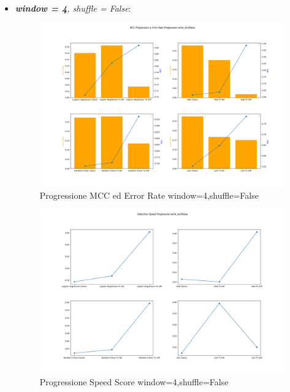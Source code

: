 \begin{itemize}
    \newpage
    \item \textit{\textbf{window = 4}, shuffle = False}:
    \begin{figure}[H]
    \centering
    \includegraphics[width=0.94\linewidth]{MCC_Progression_win4_shufFalse.png}
    \caption{Progressione MCC ed Error Rate window=4,shuffle=False}
    \label{fig:enter-label}
    \end{figure}
    \begin{figure}[H]
    \centering
    \includegraphics[width=0.94\linewidth]{Speed_Progression_win4_shufFalse.png}
    \caption{Progressione Speed Score window=4,shuffle=False}
    \label{fig:enter-label}
    \end{figure}


\end{itemize}
